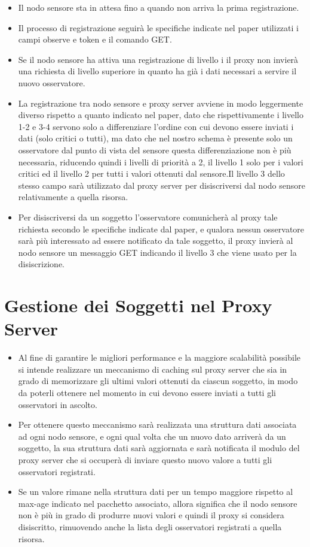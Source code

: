     \begin{itemize}
      \item Il nodo sensore sta in attesa fino a quando non arriva la prima registrazione.
      \item Il processo di registrazione seguirà le specifiche indicate nel paper utilizzati i campi observe e token e il comando GET.
      \item Se il nodo sensore ha attiva una registrazione di livello i il proxy non invierà una richiesta di livello superiore in quanto ha già i dati necessari a servire il nuovo osservatore.
      \item La registrazione tra nodo sensore e proxy server avviene in modo leggermente diverso rispetto a quanto indicato nel paper, dato che rispettivamente i livello 1-2 e 3-4 servono solo a differenziare l’ordine con cui devono essere inviati i dati (solo critici o tutti), ma dato che nel nostro schema è presente solo un osservatore dal punto di vista del sensore questa differenziazione non è più necessaria, riducendo quindi i livelli di priorità a 2, il livello 1 solo per i valori critici ed il livello 2 per tutti i valori ottenuti dal sensore.Il livello 3 dello stesso campo sarà utilizzato dal proxy server per disiscriversi dal nodo sensore relativamente a quella risorsa.
      \item Per disiscriversi da un soggetto l’osservatore comunicherà al proxy tale richiesta secondo le specifiche indicate dal paper, e qualora nessun osservatore sarà più interessato ad essere notificato da tale soggetto, il proxy invierà  al nodo sensore un messaggio GET indicando il livello 3 che viene usato per la disiscrizione.
    \end{itemize}

  \section{Gestione dei Soggetti nel Proxy Server}

    \begin{itemize}
      \item Al fine di garantire le migliori performance e la maggiore scalabilità possibile si intende realizzare un meccanismo di caching sul proxy server che sia in grado di memorizzare gli ultimi valori ottenuti da ciascun soggetto, in modo da poterli ottenere nel momento in cui devono essere inviati a tutti gli osservatori in ascolto.
      \item Per ottenere questo meccanismo sarà realizzata una struttura dati associata ad ogni nodo sensore, e ogni qual volta che un nuovo dato arriverà da un soggetto, la sua struttura dati sarà aggiornata e sarà notificata il modulo del proxy server che si occuperà di inviare questo nuovo valore a tutti gli osservatori registrati.
      \item Se un valore rimane nella struttura dati per un tempo maggiore rispetto al max-age indicato nel pacchetto associato, allora significa che il nodo sensore non è più in grado di produrre nuovi valori e quindi il proxy si considera disiscritto, rimuovendo anche la lista degli osservatori registrati a quella risorsa.
    \end{itemize}

